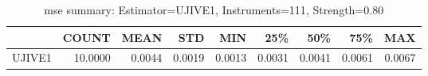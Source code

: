 \begin{table}[ht]
\centering
\caption{mse summary: Estimator=UJIVE1, Instruments=111, Strength=0.80}
\begin{tabular}{lrrrrrrrr}
\toprule
 & COUNT & MEAN & STD & MIN & 25\% & 50\% & 75\% & MAX \\
\midrule
UJIVE1 & 10.0000 & 0.0044 & 0.0019 & 0.0013 & 0.0031 & 0.0041 & 0.0061 & 0.0067 \\
\bottomrule
\end{tabular}
\end{table}
